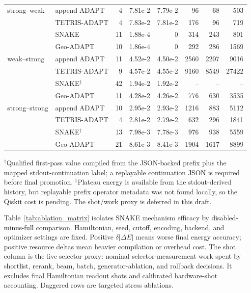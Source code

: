 \documentclass[
  reprint,
  amsmath,
  amssymb,
  aps,
  pra,
  nofootinbib,
  superscriptaddress,
  floatfix
]{revtex4-2}
\begin{document}
\begin{widetext}
\begin{minipage}{\textwidth}
\begin{center}
\begin{ruledtabular}
\begin{tabular}{p{}p{}rrrrrr}
\colrule
strong--weak & append ADAPT & 4 & 7.81e-2 & 7.79e-2 & 96 & 68 & 503 \\
 & TETRIS-ADAPT & 4 & 7.83e-2 & 7.81e-2 & 176 & 96 & 719 \\
 & SNAKE & 11 & 1.88e-4 & 0 & 314 & 243 & 801 \\
 & Geo-ADAPT & 10 & 1.86e-4 & 0 & 292 & 286 & 1569 \\
\colrule
weak--strong & append ADAPT & 11 & 4.52e-2 & 4.50e-2 & 2560 & 2207 & 9016 \\
 & TETRIS-ADAPT & 9 & 4.57e-2 & 4.55e-2 & 9160 & 8549 & 27422 \\
 & SNAKE$^\ddagger$ & 42 & 1.94e-2 & 1.92e-2 & -- & -- & -- \\
 & Geo-ADAPT & 11 & 4.28e-2 & 4.26e-2 & 776 & 630 & 3535 \\
\colrule
strong--strong & append ADAPT & 10 & 2.95e-2 & 2.93e-2 & 1216 & 883 & 5112 \\
 & TETRIS-ADAPT & 4 & 2.81e-2 & 2.79e-2 & 632 & 296 & 1841 \\
 & SNAKE$^\dagger$ & 13 & 7.98e-3 & 7.78e-3 & 976 & 938 & 5559 \\
 & Geo-ADAPT & 21 & 8.61e-3 & 8.41e-3 & 1904 & 1617 & 8899 \\
\end{tabular}
\end{ruledtabular}
\end{center}
\vspace{-0.4ex}
\noindent\footnotesize{$^\dagger$Qualified first-pass value compiled from the JSON-backed prefix plus the mapped stdout-continuation label; a replayable continuation JSON is required before final promotion. $^\ddagger$Plateau energy is available from the stdout-derived history, but replayable prefix operator metadata was not found locally, so the Qiskit cost is pending. The shot/work proxy is deferred in this draft.}
\end{minipage}
\par\addvspace{1.0ex}

Table~\ref{tab:ablation_matrix} isolates SNAKE mechanism efficacy by disabled-minus-full comparison. Hamiltonian, seed, cutoff, encoding, backend, and optimizer settings are fixed. Positive $\delta|\Delta E|$ means worse final energy accuracy; positive resource deltas mean heavier compilation or overhead cost. The shot column is the live selector proxy: nominal selector-measurement work spent by shortlist, rerank, beam, batch, generator-ablation, and rollback decisions. It excludes final Hamiltonian readout shots and calibrated hardware-shot accounting. Daggered rows are targeted stress ablations.


\end{widetext}
\end{document}
